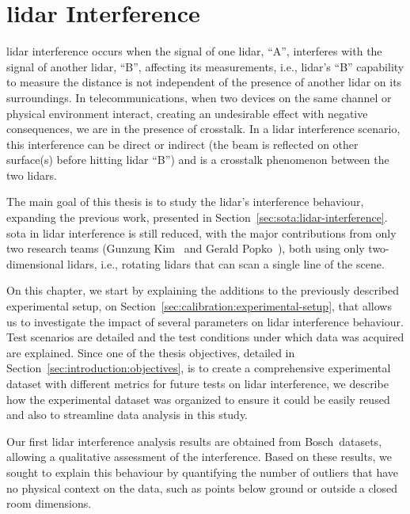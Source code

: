\chapter{\acs{lidar} Interference}
\label{chapter:lidar-interference}

\ac{lidar} interference occurs when the signal of one \ac{lidar}, ``A'', interferes with the signal of another \ac{lidar}, ``B'', affecting its measurements, i.e., \ac{lidar}'s ``B'' capability to measure the distance is not independent of the presence of another \ac{lidar} on its surroundings. In telecommunications, when two devices on the same channel or physical environment interact, creating an undesirable effect with negative consequences, we are in the presence of crosstalk. In a \ac{lidar} interference scenario, this interference can be direct or indirect (the beam is reflected on other surface(s) before hitting \ac{lidar} ``B'') and is a crosstalk phenomenon between the two \acp{lidar}.

The main goal of this thesis is to study the \ac{lidar}'s interference behaviour, expanding the previous work, presented in Section~\ref{sec:sota:lidar-interference}. \acl{sota} in \ac{lidar} interference is still reduced, with the major contributions from only two research teams (Gunzung Kim\etal~\cite{Kim2015c, Kim2017} and Gerald Popko\etal~\cite{Popko2019a, Popko2019b}), both using only two-dimensional \acp{lidar}, i.e., rotating \acp{lidar} that can scan a single line of the scene.

On this chapter, we start by explaining the additions to the previously described experimental setup, on Section~\ref{sec:calibration:experimental-setup}, that allows us to investigate the impact of several parameters on \ac{lidar} interference behaviour. Test scenarios are detailed and the test conditions under which data was acquired are explained. Since one of the thesis objectives, detailed in Section~\ref{sec:introduction:objectives}, is to create a comprehensive experimental dataset with different metrics for future tests on \ac{lidar} interference, we describe how the experimental dataset was organized to ensure it could be easily reused and also to streamline data analysis in this study.

Our first \ac{lidar} interference analysis results are obtained from Bosch\cp~datasets, allowing a qualitative assessment of the interference. Based on these results, we sought to explain this behaviour by quantifying the number of outliers that have no physical context on the data, such as points below ground or outside a closed room dimensions.

